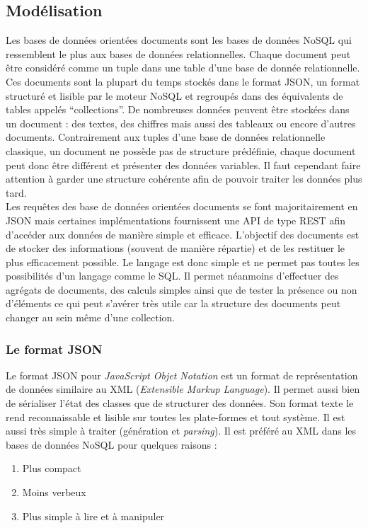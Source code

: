 \subsection{Modélisation}

	Les bases de données orientées documents sont les bases de données NoSQL qui ressemblent le plus aux bases de données relationnelles. Chaque document peut être considéré comme un tuple dans une table d'une base de donnée relationnelle. Ces documents sont la plupart du temps stockés dans le format JSON, un format structuré et lisible par le moteur NoSQL et regroupés dans des équivalents de tables appelés \enquote{collections}. De nombreuses données peuvent être stockées dans un document : des textes, des chiffres mais aussi des tableaux ou encore d'autres documents. Contrairement aux tuples d'une base de données relationnelle classique, un document ne possède pas de structure prédéfinie, chaque document peut donc être différent et présenter des données variables. Il faut cependant faire attention à garder une structure cohérente afin de pouvoir traiter les données plus tard.\\

	Les requêtes des base de données orientées documents se font majoritairement en JSON mais certaines implémentations fournissent une API de type REST afin d’accéder aux données de manière simple et efficace. L'objectif des documents est de stocker des informations (souvent de manière répartie) et de les restituer le plus efficacement possible. Le langage est donc simple et ne permet pas toutes les possibilités d'un langage comme le SQL. Il permet néanmoins d'effectuer des agrégats de documents, des calculs simples ainsi que de tester la présence ou non d'éléments ce qui peut s'avérer très utile car la structure des documents peut changer au sein même d'une collection.

	\subsubsection{Le format JSON}

	Le format JSON pour \textit{JavaScript Objet Notation} est un format de représentation de données similaire au XML (\textit{Extensible Markup Language}). Il permet aussi bien de sérialiser l'état des classes que de structurer des données. Son format texte le rend reconnaissable et lisible sur toutes les plate-formes et tout système. Il est aussi très simple à traiter (génération et \textit{parsing}). Il est préféré au XML dans les bases de données NoSQL pour quelques raisons :
	\vspace{10px}
	\begin{enumerate}
		\item Plus compact
		\item Moins verbeux
		\item Plus simple à lire et à manipuler
	\end{enumerate}

